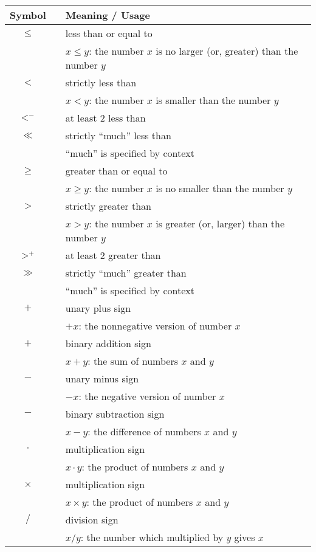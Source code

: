 \begin{tabular}{c|cl}
{\bf Symbol} & & {\bf Meaning} / {\bf Usage} \\ \hline
\hline
$\leq$
  & & less than or equal to  \\
  & & $x \leq y$: the number $x$ is no larger (or, greater) than the number $y$ \\ \hline
$<$
  & & strictly less than  \\
  & & $x < y$: the number $x$ is smaller than the number $y$ \\ \hline
$<^-$
  & & at least $2$ less than  \\ \hline
$\ll$
  & & strictly ``much'' less than \\
  & & ``much'' is specified by context \\ \hline
$\geq$
  & & greater than or equal to  \\
  & & $x \geq y$: the number $x$ is no smaller than the number $y$ \\ \hline
$>$
  & & strictly greater than  \\
  & & $x > y$: the number $x$ is greater (or, larger) than the number $y$ \\ \hline
$>^+$
  & & at least $2$ greater than  \\ \hline
$\gg$
  & & strictly ``much'' greater than \\
  & & ``much'' is specified by context \\ \hline
$+$
  & & unary plus sign \\
  & & $+x$: the nonnegative version of number $x$ \\ \hline
$+$
  & & binary addition sign \\
  & & $x+y$: the sum of numbers $x$ and $y$ \\ \hline
$-$
  & & unary minus sign \\
  & & $-x$: the negative version of number $x$ \\ \hline
$-$
  & & binary subtraction sign \\
  & & $x-y$: the difference of numbers $x$ and $y$ \\ \hline
$\cdot$
  & & multiplication sign \\
  & & $x \cdot y$: the product of numbers $x$ and $y$ \\
$\times$
  & & multiplication sign \\
  & & $x \times y$: the product of numbers $x$ and $y$ \\ \hline
$/$
  & & division sign \\
  & & $x / y$: the number which multiplied by $y$ gives $x$ \\

\end{tabular}
